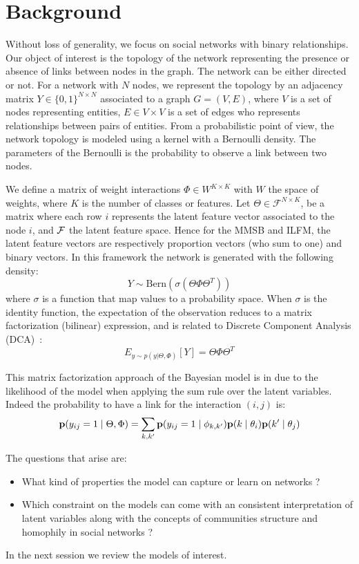 \section{Background}
\label{sec:background}
Without loss of generality, we focus on social networks with binary relationships. Our object of interest is the topology of the network representing the presence or absence of links between nodes in the graph. The network can be either directed or not. For a network with $N$ nodes, we represent the topology by an adjacency matrix $Y \in \{0,1\}^{N\times N}$ associated to a graph $G = (V,E)$, where $V$ is a set of nodes representing entities, $E \in V \times V$ is a set of edges who represents relationships between pairs of entities. From a probabilistic point of view, the network topology is modeled using a kernel with a Bernoulli density. The parameters of the Bernoulli is the probability to observe a link between two nodes.

We define a matrix of weight interactions $\Phi \in W^{K\times K}$ with $W$ the space of weights, where $K$ is the number of classes or features. Let $\Theta \in \mathcal{F}^{N\times K}$, be a matrix where each row $i$ represents the latent feature vector associated to the node $i$,  and $\cal{F}$ the latent feature space. Hence for the MMSB and ILFM, the latent feature vectors are respectively proportion vectors (who sum to one) and binary vectors. In this framework the network is generated with the following density:
\begin{equation} \label{MFDCA}
    Y \sim \mathrm{Bern}(\sigma(\Theta \Phi  \Theta^T))
\end{equation}
where $\sigma$ is a function that map values to a probability space. When $\sigma$ is the identity function, the expectation of the observation reduces to a matrix factorization (bilinear) expression, and is related to Discrete Component Analysis (DCA)~\cite{DCA}:
\begin{equation}
E_{y \sim p(y|\Theta, \Phi)}[Y] = \Theta \Phi  \Theta^T
\end{equation}

This matrix factorization approach of the Bayesian model is in due to the likelihood of the model when applying the sum rule over the latent variables. Indeed the probability to have a link for the interaction $(i,j)$ is:
\begin{equation}
\mathbf{p}(y_{ij}=1 \mid \Theta, \Phi ) = \sum_{k, k'} \mathbf{p}(y_{ij}=1\mid\phi_{k,k'}) \mathbf{p}(k \mid\theta_i) \mathbf{p}(k' \mid \theta_j)
\end{equation}


The questions that arise are:
\begin{itemize}
	\item What kind of properties the model can capture or learn on networks ?
	\item Which constraint on the models can come with an consistent interpretation of latent variables along with the concepts of communities structure and homophily in social networks  ?
\end{itemize} 

In the next session we review the models of interest.

